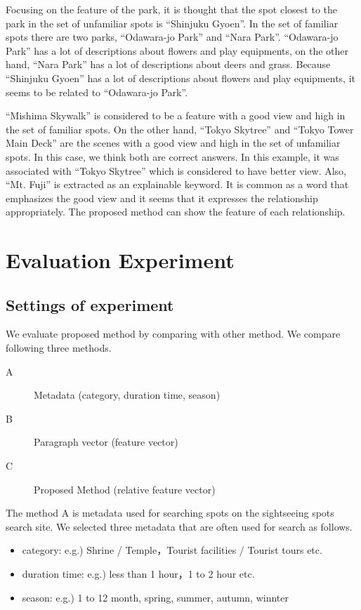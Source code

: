 \documentclass[journal]{IAENGtran}
\begin{document}
Focusing on the feature of the park, it is thought that the spot closest to the park in the set of unfamiliar spots is ``Shinjuku Gyoen''.
In the set of familiar spots there are two parks, ``Odawara-jo Park'' and ``Nara Park''.
``Odawara-jo Park'' has a lot of descriptions about flowers and play equipments, on the other hand, ``Nara Park'' has a lot of descriptions about deers and grass.
Because ``Shinjuku Gyoen'' has a lot of descriptions about flowers and play equipments, it seems to be related to ``Odawara-jo Park''.

``Mishima Skywalk'' is considered to be a feature with a good view and high in the set of familiar spots.
On the other hand, ``Tokyo Skytree'' and ``Tokyo Tower Main Deck'' are the scenes with a good view and high in the set of unfamiliar spots.
In this case, we think both are correct answers. In this example, it was associated with ``Tokyo Skytree'' which is considered to have better view.
Also, ``Mt. Fuji'' is extracted as an explainable keyword. It is common as a word that emphasizes the good view and it seems that it expresses the relationship appropriately.
The proposed method can show the feature of each relationship.

\section{Evaluation Experiment}
\label{sec:Evaluation Experiment}
\subsection{Settings of experiment}
\label{subsec:Settings of experiment}
We evaluate proposed method by comparing with other method.
We compare following three methods.
\begin{description}
\item[A]Metadata (category, duration time, season)
\item[B]Paragraph vector (feature vector)
\item[C]Proposed Method (relative feature vector)
\end{description}

The method A is metadata used for searching spots on the sightseeing spots search site.
We selected three metadata that are often used for search as follows.
\begin{itemize}
\item category: e.g.) Shrine / Temple，Tourist facilities / Tourist tours etc.
\item duration time: e.g.) less than 1 hour，1 to 2 hour etc.
\item season: e.g.) 1 to 12 month, spring, summer, autumn, winnter
\end{itemize}
\end{document}
